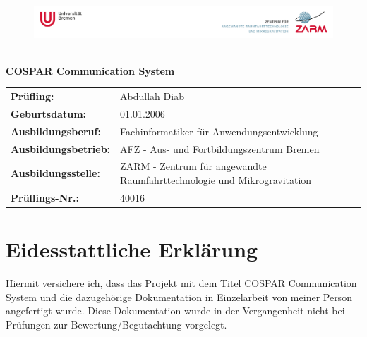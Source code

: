 \documentclass[11pt,a4paper]{article}
\begin{document}
\thispagestyle{empty}

\begin{figure}[H]
    \hspace*{-2.0cm}\vspace*{2cm}\includegraphics[height=2.2cm]{image1.png}
\end{figure}

\vspace{3cm}

\begin{center}
    {\Huge \textbf{COSPAR Communication System}}
\end{center}

\vfill

\begin{center}
    \begin{tabular}{ll}
        \textbf{Prüfling:} & Abdullah Diab \\[0.5em]
        \textbf{Geburtsdatum:} & 01.01.2006 \\[0.5em]
        \textbf{Ausbildungsberuf:} & Fachinformatiker für Anwendungsentwicklung \\[0.5em]
        \textbf{Ausbildungsbetrieb:} & AFZ - Aus- und Fortbildungszentrum Bremen \\[0.5em]
        \textbf{Ausbildungsstelle:} & ZARM - Zentrum für angewandte Raumfahrttechnologie und Mikrogravitation \\[0.5em]
        \textbf{Prüflings-Nr.:} & 40016 \\
    \end{tabular}
\end{center}

\vspace{2cm}

\newpage

\section*{Eidesstattliche Erklärung}
\thispagestyle{empty}

Hiermit versichere ich, dass das Projekt mit dem Titel \glqq COSPAR Communication System\grqq{} und die dazugehörige Dokumentation in Einzelarbeit von meiner Person angefertigt wurde. Diese Dokumentation wurde in der Vergangenheit nicht bei Prüfungen zur Bewertung/Begutachtung vorgelegt.
\end{document}
